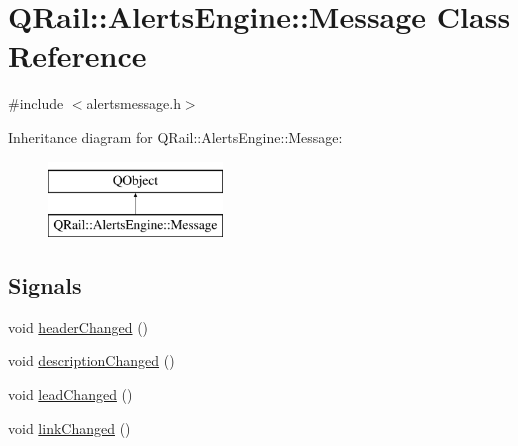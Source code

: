 \hypertarget{classQRail_1_1AlertsEngine_1_1Message}{}\section{Q\+Rail\+::Alerts\+Engine\+::Message Class Reference}
\label{classQRail_1_1AlertsEngine_1_1Message}


{\ttfamily \#include $<$alertsmessage.\+h$>$}

Inheritance diagram for Q\+Rail\+::Alerts\+Engine\+::Message\+:\begin{figure}[H]
\begin{center}
\leavevmode
\includegraphics[height=2.000000cm]{classQRail_1_1AlertsEngine_1_1Message}
\end{center}
\end{figure}
\subsection*{Signals}
\begin{DoxyCompactItemize}
\item 
void \mbox{\hyperlink{classQRail_1_1AlertsEngine_1_1Message_a682685d984964fe4f0bc6048fd11206d}{header\+Changed}} ()
\item 
void \mbox{\hyperlink{classQRail_1_1AlertsEngine_1_1Message_a2558eb50cea5ae890fc68628e54ad9a0}{description\+Changed}} ()
\item 
void \mbox{\hyperlink{classQRail_1_1AlertsEngine_1_1Message_a119795fc0c8d4c3b6d041844b83cf5ab}{lead\+Changed}} ()
\item 
void \mbox{\hyperlink{classQRail_1_1AlertsEngine_1_1Message_afccc9835aa7a6ec718a23cb5f8fbc73d}{link\+Changed}} ()
\end{DoxyCompactItemize}
